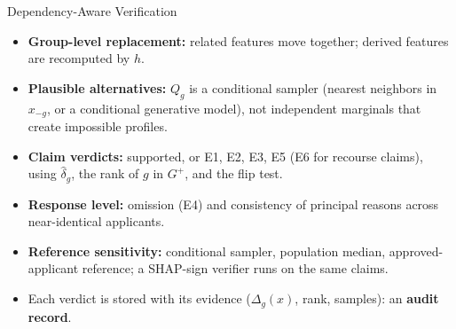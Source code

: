 \documentclass[aspectratio=169,10pt]{beamer}
\begin{document}
\begin{frame}{Dependency-Aware Verification}
  \vspace{1.5ex}
  \begin{itemize}\small
    \setlength{\itemsep}{1.1ex}
    \item[\textbullet] {\color{vrblue}\bfseries Group-level replacement:} related features move together; derived features are recomputed by $h$.
    \item[\textbullet] {\color{vrblue}\bfseries Plausible alternatives:} $Q_g$ is a conditional sampler (nearest neighbors in $x_{-g}$, or a conditional generative model), not independent marginals that create impossible profiles.
    \item[\textbullet] {\color{vrblue}\bfseries Claim verdicts:} supported, or E1, E2, E3, E5 (E6 for recourse claims), using $\widehat\delta_g$, the rank of $g$ in $G^+$, and the flip test.
    \item[\textbullet] {\color{vrblue}\bfseries Response level:} omission (E4) and consistency of principal reasons across near-identical applicants.
    \item[\textbullet] {\color{vrblue}\bfseries Reference sensitivity:} conditional sampler, population median, approved-applicant reference; a SHAP-sign verifier runs on the same claims.
    \item[\textbullet] Each verdict is stored with its evidence ($\Delta_g(x)$, rank, samples): an {\color{vrblue}\bfseries audit record}.
  \end{itemize}
\end{frame}
\end{document}

